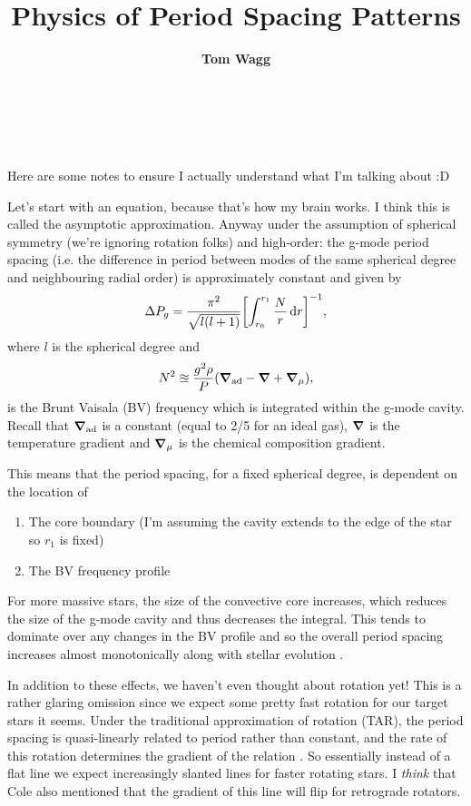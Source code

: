 \documentclass[12pt]{article}
\title{Physics of Period Spacing Patterns}
\author{\textbf{Tom Wagg}}
\newcommand{\tomtitle}{
    \noindent {\LARGE \fontfamily{cmr}\selectfont \textbf{\thetitle}} \hfill \\[1\baselineskip]
    \noindent {\large \fontfamily{cmr}\selectfont Kavli Summer Program \hfill \textsc{Tom Wagg}}\\[0.5\baselineskip]
}
\begin{document}
\tomtitle{}

\thispagestyle{empty}

Here are some notes to ensure I actually understand what I'm talking about :D

Let's start with an equation, because that's how my brain works. I think this is called the asymptotic approximation. Anyway under the assumption of spherical symmetry (we're ignoring rotation folks) and high-order: the g-mode period spacing (i.e. the difference in period between modes of the same spherical degree and neighbouring radial order) is approximately constant and given by \citep[e.g.,][]{Hatta+2023}
\begin{equation}
    \Delta P_g = \frac{\pi^2}{\sqrt{l(l+1)}} \qty[\int_{r_0}^{r_1} \frac{N}{r} \dd{r}]^{-1},
\end{equation}
where $l$ is the spherical degree and
\begin{equation}
    N^2 \approxeq \frac{g^2 \rho}{P} \qty(\grad_{\rm ad} - \grad + \grad_\mu),
\end{equation}
is the Brunt Vaisala (BV) frequency which is integrated within the g-mode cavity. Recall that $\grad_{\rm ad}$ is a constant (equal to 2/5 for an ideal gas), $\grad$ is the temperature gradient and $\grad_\mu$ is the chemical composition gradient.

This means that the period spacing, for a fixed spherical degree, is dependent on the location of
\begin{enumerate}
    \item The core boundary (I'm assuming the cavity extends to the edge of the star so $r_1$ is fixed)
    \item The BV frequency profile
\end{enumerate}
For more massive stars, the size of the convective core increases, which reduces the size of the g-mode cavity and thus decreases the integral. This tends to dominate over any changes in the BV profile and so the overall period spacing increases almost monotonically along with stellar evolution \citep{Miglio+2008}.

In addition to these effects, we haven't even thought about rotation yet! This is a rather glaring omission since we expect some pretty fast rotation for our target stars it seems. Under the traditional approximation of rotation (TAR), the period spacing is quasi-linearly related to period rather than constant, and the rate of this rotation determines the gradient of the relation \citep{Bouabid+2013}. So essentially instead of a flat line we expect increasingly slanted lines for faster rotating stars. I \textit{think} that Cole also mentioned that the gradient of this line will flip for retrograde rotators.
\end{document}
